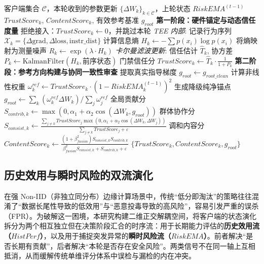 \documentclass[11pt, a4paper, UTF8, fontset=fandol]{ctexart}
\begin{document}
\begin{algorithm}[htbp]
    \caption{基于 TEE 硬件锚点与纯净参考的准入与内容审查}
    \label{alg:phase12}
    \begin{algorithmic}[1]
        \REQUIRE 客户端集合 $\mathcal{C}$，本轮收到的参数更新 $\{\Delta W_k\}_{k\in\mathcal{C}}$，上轮状态 $RiskEMA^{(t-1)}$
        \ENSURE $TrustScore_k$, $ContentScore_k$, 有效参考基准 $g_{root}$
        \STATE \textbf{第一阶段：硬件锚定与动态信任度量}
        \STATE 拒绝接入：$TrustScore_k \leftarrow 0$，并跳过本轮
        \ELSE
        \STATE \textit{TEE 内部}: 记录行为序列 $\mathcal{X}_k = \{ \Delta \text{grad}, \Delta \text{loss}, \text{instr\_dist} \}$
        \STATE 计算信息熵 $H_k \leftarrow -\sum p(x_i) \log p(x_i)$
        \STATE 将熵映射为测量噪声 $R_k \leftarrow \exp(\lambda \cdot H_k)$
        \STATE \textit{卡尔曼滤波更新}:
        \STATE 信任估计 $\hat{T}_k$, 协方差 $P_k \leftarrow \mathrm{KalmanFilter}(H_k, \text{前序状态})$
        \STATE 门禁信任分 $TrustScore_k \leftarrow \hat{T}_k \cdot \frac{1}{1 + P_k}$
        \ENDIF
        \ENDFOR
        \STATE \textbf{第二阶段：参考方向构建与协同一致性审查}
        \STATE 提取真实指导梯度 $g_{root} \leftarrow g_{root\_clean}$
        \ELSE
        \STATE 计算非线性权重 $\omega_k^{ref} \leftarrow TrustScore_k \cdot (1 - RiskEMA_k^{(t-1)})^2$
        \STATE 生成降级纯净锚点 $g_{root} \leftarrow \sum_k (\omega_k^{ref} \Delta W_k) / \sum_j \omega_j^{ref}$
        \ENDIF
        \STATE 全局贡献分 $S_{contrib,k} \leftarrow \max(0, \alpha_1 + \alpha_2 \cos(\Delta W_k, g_{root}))$
        \STATE 群体协作分 $S_{consist,k} \leftarrow \frac{\sum_{j \neq k} TrustScore_j \max(0, \alpha_1 + \alpha_2 \cos(\Delta W_k, \Delta W_j))}{\sum_{j \neq k} TrustScore_j + \varepsilon}$
        \STATE 调和内容分 $ContentScore_k \leftarrow \frac{(1+\beta_{fusion}^2)S_{consist,k} S_{contrib,k}}{\beta_{fusion}^2 S_{consist,k} + S_{contrib,k} + \varepsilon}$
        \ENDFOR
        \RETURN $\{TrustScore_k, ContentScore_k, g_{root}\}$
    \end{algorithmic}
\end{algorithm}


\subsection{历史效用与瞬时风险的双流演化}
在强 Non-IID（非独立同分布）边缘计算场景中，传统“低分即淘汰”的策略往往混淆了“数据长尾性导致的低效用”与“恶意投毒导致的高风险”，容易引发严重的误杀（FPR）。为破解这一困境，本研究构建二维正交解耦空间，将客户端的状态演化拆分为两个相互独立但在决策阶段汇合的时序流：用于长期能力评估的\textbf{历史效用流（$HistPerf$）}，以及用于捕捉突发异常的\textbf{瞬时风险流（$RiskEMA$）}。前者解决“是否长期有贡献”，后者解决“本轮是否存在安全风险”。两类信号不在同一轴上互相抵消，从而缓解传统单维评分体系中误检与漏检的内在冲突。
\end{document}
